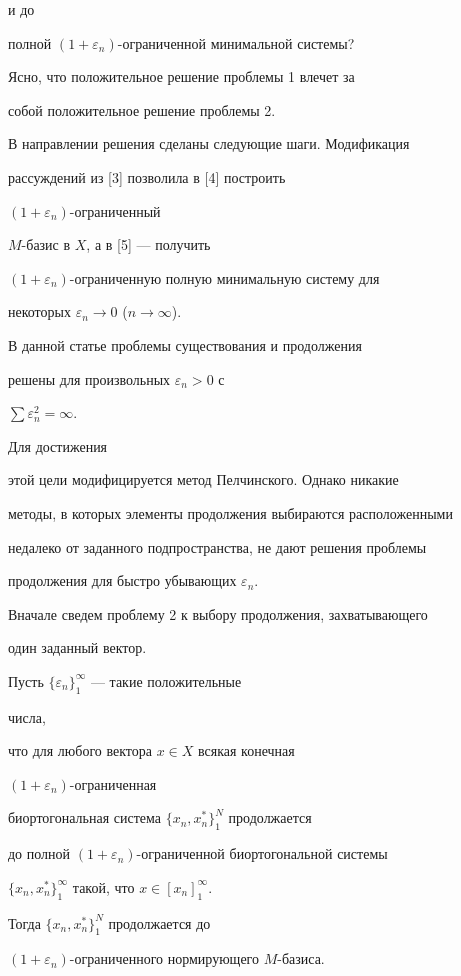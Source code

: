 и до 


полной $(1+\varepsilon_n)$-ограниченной минимальной системы? 


\medskip 


 


Ясно, что положительное решение проблемы 1 влечет за 


собой положительное решение проблемы 2. 


В направлении решения сделаны следующие шаги. Модификация 


рассуждений из [3] позволила в [4] построить 


$(1+\varepsilon_n)$-ограниченный 


$M$-базис в $X$, а в [5] --- получить 


$(1+\varepsilon_n)$-ограниченную полную минимальную систему для 


некоторых $\varepsilon_n\to 0$ ($n\to\infty$). 


 


В данной статье проблемы существования и продолжения 


решены для произвольных $\varepsilon_n>0$ с 


$\sum\varepsilon^2_n=\infty$. 


Для достижения 


этой цели модифицируется метод Пелчинского. Однако никакие 


методы, в которых элементы продолжения выбираются расположенными 


недалеко от заданного подпространства, не дают решения проблемы 


продолжения для быстро убывающих $\varepsilon_n$. 


 


Вначале сведем проблему 2 к выбору продолжения, захватывающего 


один заданный вектор. 


 


\begin{lem} Пусть $\{\varepsilon_n\}^\infty_1$ --- такие положительные 


числа, 


что для любого вектора $x\in X$ всякая конечная 


$(1+\varepsilon_n)$-ограниченная 


биортогональная система $\{x_n,x^*_n\}^N_1$ продолжается 


до полной $(1+\varepsilon_n)$-ограниченной биортогональной системы 


$\{x_n,x^*_n\}^\infty_1$ такой, что $x\in[x_n]^\infty_1$. 


Тогда $\{x_n,x^*_n\}^N_1$ продолжается до 


$(1+\varepsilon_n)$-ограниченного нормирующего $M$-базиса. 


\end{lem} 


